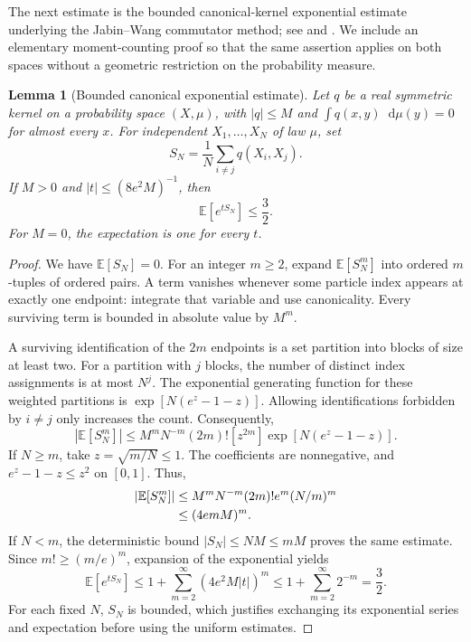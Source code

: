 \documentclass[11pt,reqno]{amsart}
\numberwithin{equation}{section}
\newtheorem{lemma}[lemma]{Lemma}
\theoremstyle{definition}
\theoremstyle{remark}
\newcommand{\E}{\mathbb E}
\newcommand{\dd}{\mathop{}\!\mathrm d}
\begin{document}
The next estimate is the bounded canonical-kernel exponential estimate underlying the Jabin--Wang commutator method; see \cite[Theorem~2.2]{BJW} and \cite[Lemma~9.1]{CdCRS}. We include an elementary moment-counting proof so that the same assertion applies on both spaces without a geometric restriction on the probability measure.

\begin{lemma}[Bounded canonical exponential estimate]\label{lem:canonical}
Let $q$ be a real symmetric kernel on a probability space $(X,\mu)$, with $|q|\leq M$ and $\int q(x,y)\dd\mu(y)=0$ for almost every $x$. For independent $X_1,\ldots,X_N$ of law $\mu$, set
\begin{equation}\label{eq:canonical-statistic}
 S_N=\frac1N\sum_{i\ne j}q(X_i,X_j).
\end{equation}
If $M>0$ and $|t|\leq(8e^2M)^{-1}$, then
\begin{equation}\label{eq:canonical-exponential}
 \E[e^{tS_N}]\leq\frac32.
\end{equation}
For $M=0$, the expectation is one for every $t$.
\end{lemma}
\begin{proof}
We have $\E[S_N]=0$. For an integer $m\geq2$, expand $\E[S_N^m]$ into ordered $m$-tuples of ordered pairs. A term vanishes whenever some particle index appears at exactly one endpoint: integrate that variable and use canonicality. Every surviving term is bounded in absolute value by $M^m$.

A surviving identification of the $2m$ endpoints is a set partition into blocks of size at least two. For a partition with $j$ blocks, the number of distinct index assignments is at most $N^j$. The exponential generating function for these weighted partitions is $\exp[N(e^z-1-z)]$. Allowing identifications forbidden by $i\ne j$ only increases the count. Consequently,
\begin{equation}\label{eq:canonical-count}
 |\E[S_N^m]|\leq M^mN^{-m}(2m)![z^{2m}]
                          \exp[N(e^z-1-z)].
\end{equation}
If $N\geq m$, take $z=\sqrt{m/N}\leq1$. The coefficients are nonnegative, and $e^z-1-z\leq z^2$ on $[0,1]$. Thus,
\begin{align}
 |\E[S_N^m]|&\leq M^mN^{-m}(2m)!e^m(N/m)^m\notag\\
 &\leq(4emM)^m.
 \label{eq:canonical-moments}
\end{align}
If $N<m$, the deterministic bound $|S_N|\leq NM\leq mM$ proves the same estimate. Since $m!\geq(m/e)^m$, expansion of the exponential yields
\begin{equation}\label{eq:canonical-series}
 \E[e^{tS_N}]
 \leq1+\sum_{m=2}^{\infty}(4e^2M|t|)^m
 \leq1+\sum_{m=2}^{\infty}2^{-m}=\frac32.
\end{equation}
For each fixed $N$, $S_N$ is bounded, which justifies exchanging its exponential series and expectation before using the uniform estimates.
\end{proof}
\end{document}
